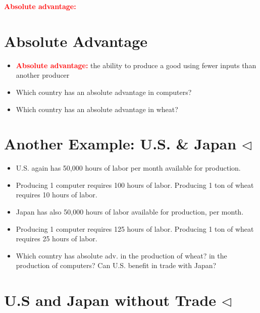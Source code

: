 \documentclass[
]{book}
\begin{document}
\textcolor{red}{\textbf{Absolute advantage:}}

\hypertarget{absolute-advantage}{%
\section{Absolute Advantage}\label{absolute-advantage}}

\begin{itemize}
\item
  \textcolor{red}{\textbf{Absolute advantage:}} the ability to produce a good using fewer inputs than another producer
\item
  Which country has an absolute advantage in computers?
\item
  Which country has an absolute advantage in wheat?
\end{itemize}

\hypertarget{another-example-u.s.-japan-triangleleft}{%
\section{\texorpdfstring{Another Example: U.S. \& Japan \(\triangleleft\)}{Another Example: U.S. \& Japan \textbackslash triangleleft}}\label{another-example-u.s.-japan-triangleleft}}

\begin{itemize}
\item
  U.S. again has 50,000 hours of labor per month available for production.
\item
  Producing 1 computer requires 100 hours of labor. Producing 1 ton of wheat requires 10 hours of labor.
\item
  Japan has also 50,000 hours of labor available for production, per month.
\item
  Producing 1 computer requires 125 hours of labor. Producing 1 ton of wheat requires 25 hours of labor.
\item
  Which country has absolute adv. in the production of wheat? in the production of computers? Can U.S. benefit in trade with Japan?
\end{itemize}

\hypertarget{u.s-and-japan-without-trade-triangleleft}{%
\section{\texorpdfstring{U.S and Japan without Trade \(\triangleleft\)}{U.S and Japan without Trade \textbackslash triangleleft}}\label{u.s-and-japan-without-trade-triangleleft}}
\end{document}

